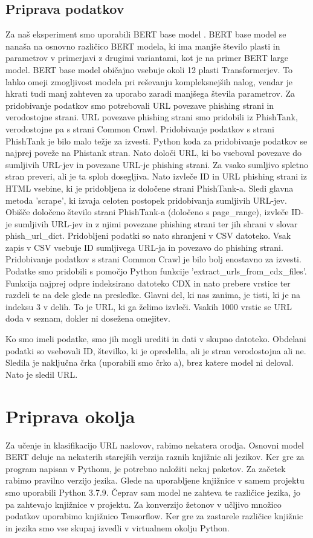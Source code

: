\documentclass[sigconf,nonacm]{acmart}
\begin{document}
\subsection{Priprava podatkov}
Za naš eksperiment smo uporabili BERT base model \cite{turc2019}. BERT base model se nanaša na osnovno različico BERT modela, ki ima manjše število plasti in parametrov v primerjavi z drugimi variantami, kot je na primer BERT large model. BERT base model običajno vsebuje okoli 12 plasti Transformerjev. To lahko omeji zmogljivost modela pri reševanju kompleksnejših nalog, vendar je hkrati tudi manj zahteven za uporabo zaradi manjšega števila parametrov.
Za pridobivanje podatkov smo potrebovali URL povezave phishing strani in verodostojne strani. URL povezave phishing strani smo pridobili iz PhishTank, verodostojne pa s strani Common Crawl.
Pridobivanje podatkov s strani PhishTank je bilo malo težje za izvesti. Python koda za pridobivanje podatkov se najprej poveže na Phistank stran. Nato določi URL, ki bo vseboval povezave do sumljivih URL-jev in povezane URL-je phishing strani. Za vsako sumljivo spletno stran preveri, ali je ta sploh dosegljiva. Nato izvleče ID in URL phishing strani iz HTML vsebine, ki je pridobljena iz določene strani PhishTank-a. Sledi glavna metoda 'scrape', ki izvaja celoten postopek pridobivanja sumljivih URL-jev. Obišče določeno število strani PhishTank-a (določeno s page\_range), izvleče ID-je sumljivih URL-jev in z njimi povezane phishing strani ter jih shrani v slovar phish\_url\_dict. Pridobljeni podatki so nato shranjeni v CSV datoteko. Vsak zapis v CSV vsebuje ID sumljivega URL-ja in povezavo do phishing strani.
Pridobivanje podatkov s strani Common Crawl je bilo bolj enostavno za izvesti. Podatke smo pridobili s pomočjo Python funkcije 'extract\_urls\_from\_cdx\_files'. Funkcija najprej odpre indeksirano datoteko CDX in nato prebere vrstice ter razdeli te na dele glede na presledke. Glavni del, ki nas zanima, je tisti, ki je na indeksu 3 v delih. To je URL, ki ga želimo izvleči. Vsakih 1000 vrstic se URL doda v seznam, dokler ni dosežena omejitev.


Ko smo imeli podatke, smo jih mogli urediti in dati v skupno datoteko. Obdelani podatki so vsebovali ID, številko, ki je opredelila, ali je stran verodostojna ali ne. Sledila je naključna črka (uporabili smo črko a), brez katere model ni deloval. Nato je sledil URL. 

\section{Priprava okolja}
Za učenje in klasifikacijo URL naslovov, rabimo nekatera orodja. Osnovni model BERT deluje na nekaterih starejših verzija raznih knjižnic ali jezikov. Ker gre za program napisan v Pythonu, je potrebno naložiti nekaj paketov. Za začetek rabimo pravilno verzijo jezika. Glede na uporabljene knjižnice v samem projektu smo uporabili Python 3.7.9. Čeprav sam model ne zahteva te različice jezika, jo pa zahtevajo knjižnice v projektu. Za konverzijo žetonov v učljivo množico podatkov uporabimo knjižnico Tensorflow. Ker gre za zastarele različice knjižnic in jezika smo vse skupaj izvedli v virtualnem okolju Python.
\end{document}
